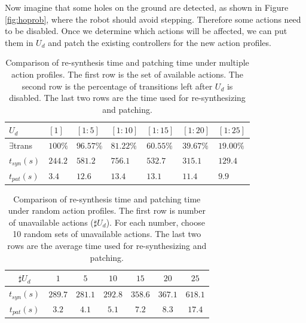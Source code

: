 Now imagine that some holes on the ground are detected, as shown in Figure \ref{fig:hoprob}, where the robot should avoid stepping. Therefore some actions need to be disabled. Once we determine which actions will be affected, we can put them in $ U_d $ and patch the existing controllers for the new action profiles.
\begin{table}
	\caption{Comparison of re-synthesis time and patching time under multiple action profiles. The first row is the set of available actions. The second row is the percentage of transitions left after $ U_d $ is disabled. The last two rows are the time used for re-synthesizing and patching.}
	\begin{tabular}{lllllll}
		\hline 
		$ U_d $ & $ [1] $ &$ [1:5] $ & $ [1:10] $ & $ [1:15] $ & $ [1:20] $ & $ [1:25] $ \\ 
		\hline 
		$ \exists $trans & $ 100\% $ & $ 96.57\% $ & $ 81.22\% $ & $ 60.55\% $ & $ 39.67\% $ & $ 19.00\% $\\
		$ t_{syn}(s) $ & $ 244.2 $ & $ 581.2 $ & $ 756.1 $ & $ 532.7 $ & $ 315.1 $ & $ 129.4 $ \\
		$ t_{pat}(s)$ & $ 3.4 $ & $ 12.6 $ & $ 13.4 $ & $ 13.1 $ & $ 11.4 $ & $ 9.9 $ \\ 
		\hline 
	\end{tabular} 
	\label{tab: exper}
\end{table}

\begin{table}
	\caption{Comparison of re-synthesis time and patching time under random action profiles. The first row is number of unavailable actions ($ \sharp U_d $). For each number, choose 10 random sets of unavailable actions. The last two rows are the average time used for re-synthesizing and patching.}
	\begin{tabular}{ccccccc}
		\hline 
		$ \sharp U_d $ & $ 1 $ &$ 5 $ & $ 10 $ & $ 15 $ & $ 20 $ & $ 25 $ \\ 
		\hline 
		$ t_{syn}(s) $ & $ 289.7 $ & $ 281.1 $ & $ 292.8 $ & $ 358.6 $ &  $ 367.1 $ & $ 618.1 $ \\
		$ t_{pat}(s)$ & $ 3.2 $ & $ 4.1 $ & $ 5.1 $ & $ 7.2 $ & $ 8.3 $ & $ 17.4 $ \\ 
		\hline 
	\end{tabular} 
	\label{tab: exper2}
\end{table}

